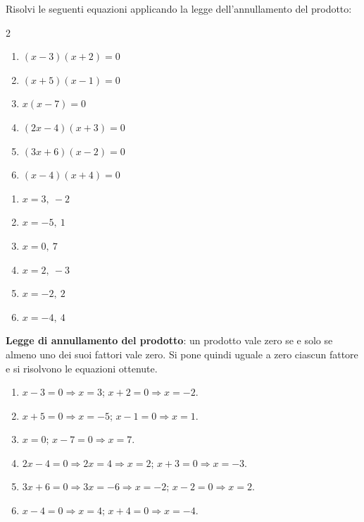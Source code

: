 \begin{question}[ID=5.1, subtitle={Legge dell'annullamento del prodotto}, difficulty=facile, tags={annullamento del prodotto}]
Risolvi le seguenti equazioni applicando la legge dell'annullamento del prodotto:
\begin{multicols}{2}
\begin{enumerate}[leftmargin=3cm]
    \item $(x-3)(x+2)=0$
    \item $(x+5)(x-1)=0$
    \item $x(x-7)=0$
    \item $(2x-4)(x+3)=0$
    \item $(3x+6)(x-2)=0$
    \item $(x-4)(x+4)=0$
\end{enumerate}
\end{multicols}
\begin{solution}
\begin{enumerate}
    \item $x=3,\ -2$
    \item $x=-5,\ 1$
    \item $x=0,\ 7$
    \item $x=2,\ -3$
    \item $x=-2,\ 2$
    \item $x=-4,\ 4$
\end{enumerate}
\end{solution}
\begin{explanation}
\textbf{Legge di annullamento del prodotto}: un prodotto vale zero se e solo se almeno uno dei suoi fattori vale zero. Si pone quindi uguale a zero ciascun fattore e si risolvono le equazioni ottenute.
\begin{enumerate}
    \item $x-3=0 \Rightarrow x=3$; \quad $x+2=0 \Rightarrow x=-2$.
    \item $x+5=0 \Rightarrow x=-5$; \quad $x-1=0 \Rightarrow x=1$.
    \item $x=0$; \quad $x-7=0 \Rightarrow x=7$.
    \item $2x-4=0 \Rightarrow 2x=4 \Rightarrow x=2$; \quad $x+3=0 \Rightarrow x=-3$.
    \item $3x+6=0 \Rightarrow 3x=-6 \Rightarrow x=-2$; \quad $x-2=0 \Rightarrow x=2$.
    \item $x-4=0 \Rightarrow x=4$; \quad $x+4=0 \Rightarrow x=-4$.
\end{enumerate}
\end{explanation}
\end{question}

